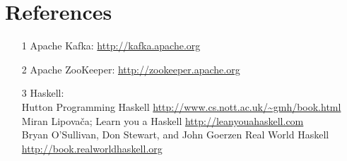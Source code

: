 \section*{References}
\begin{itemize}
    \item [1] Apache Kafka: \url{http://kafka.apache.org}
    \item [2] Apache ZooKeeper: \url{http://zookeeper.apache.org}
    \item [3] Haskell: \\
           Hutton Programming Haskell
           \url{http://www.cs.nott.ac.uk/~gmh/book.html}\\
            Miran Lipovača; Learn you a Haskell
            \url{http://leanyouahaskell.com} \\
            Bryan O'Sullivan, Don Stewart, and John Goerzen  Real World Haskell 
            \url{http://book.realworldhaskell.org}
\end{itemize}

